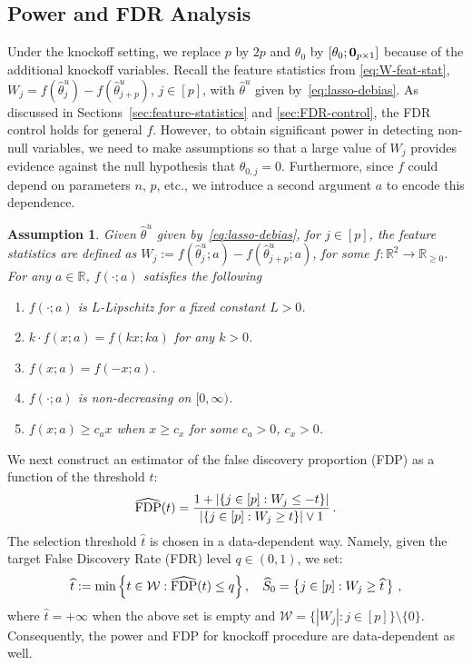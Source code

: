 \documentclass[11pt]{article}
\newcommand{\mbR}{\mathbb{R}}
\newcommand{\FDP}{{\rm FDP}}
\newcommand{\hS}{\widehat{S}}
\newcommand{\hth}{\widehat{\theta}}
\newcommand{\wht}{\widehat{t}}
\newtheorem{assumption}{Assumption}
\begin{document}
\subsection{Power and FDR Analysis}\label{sec:Power-FDR-analysis}

Under the knockoff setting, we replace $p$ by $2p$ and $\theta_0$ by $[\theta_0;{{\bf0}}_{p\times 1}]$ because of the additional knockoff variables. Recall the feature statistics from \eqref{eq:W-feat-stat}, $W_j = f(\hth^u_j)-f(\hth^u_{j+p})$, $j\in[p]$, with $\hth^u$ given by~\eqref{eq:lasso-debias}. As discussed in Sections~\ref{sec:feature-statistics} and \ref{sec:FDR-control}, the FDR control holds for general $f$. However, to obtain significant power in detecting non-null variables, we need to make assumptions so that a large value of $W_j$ provides evidence against the null hypothesis that $\theta_{0,j}=0$. Furthermore, since $f$ could depend on parameters $n$, $p$, etc., we introduce a second argument $a$ to encode this dependence. 
\begin{assumption}\label{ass:f-feat-stat}
    Given $\hth^u$ given by~\eqref{eq:lasso-debias}, for $j\in[p]$, the feature statistics are defined as $W_j:=f(\hth^u_j;a)-f(\hth^u_{j+p};a)$, for some $f:\mbR^2\to\mbR_{\ge 0}$. For any $a\in \mbR$, $f(\cdot;a)$ satisfies the following
\begin{enumerate}
    \item $f(\cdot;a)$ is $L$-Lipschitz for a fixed constant $L>0$.
    \item $k\cdot f(x;a)=f(kx;ka)$ for any $k>0$.
    \item $f(x;a)=f(-x;a)$.
    \item $f(\cdot;a)$ is non-decreasing on $[0,\infty)$.
    \item $f(x;a)\ge c_ax$ when $x\ge c_x$ for some $c_a>0$, $c_x>0$.
\end{enumerate}
\end{assumption}

We next construct an estimator of the false discovery proportion (FDP) as a function of the threshold $t$:
\begin{equation}\label{eq:FDP-hat}
    \widehat{\FDP}(t) = \frac{1+|\{j\in[p]:W_j\leq -t\}|}{|\{j\in[p]:W_j\geq t\}|\vee 1} \,.
\end{equation}
The selection threshold $\wht$ is chosen in a data-dependent way. Namely, given the target False Discovery Rate (FDR) level $q\in(0,1)$, we set:
\[
    \widehat{t} := \min \left\{t\in \mathcal W: \widehat{\FDP}(t)\leq q\right\},\phantom{ss}\hS_0=\left\{j\in[p]:W_j\geq\wht\, \right\}\,,
\]
where $\wht=+\infty$ when the above set is empty and $\mathcal{W}=\{|W_j|:j\in[p]\}\setminus{\{0\}}$. Consequently, the power and FDP for knockoff procedure are data-dependent as well. 
\end{document}
